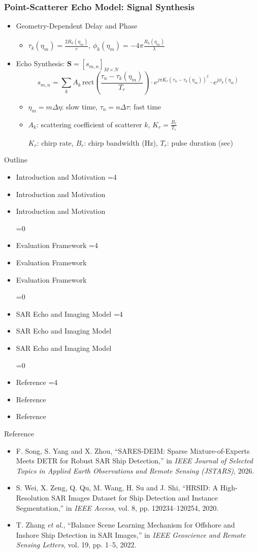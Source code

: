 \documentclass[aspectratio=169, 11pt]{beamer}
\newcommand{\dsrlabActiveSec}{0}
\newcommand{\dsrlaboutlineitem}[2]{%
  \ifnum\dsrlabActiveSec=0
    \item #2
  \else
    \ifnum#1=\dsrlabActiveSec
      \item #2
    \else
      \item {\color{dsrlabGrayLabel}#2}
    \fi
  \fi
}
\newcommand{\dsrlabSectionOutline}[1]{%
  \renewcommand{\dsrlabActiveSec}{#1}%
  \begin{frame}{Outline}
    \begin{itemize}
      \dsrlaboutlineitem{1}{Introduction and Motivation}
      \dsrlaboutlineitem{2}{Evaluation Framework}
      \dsrlaboutlineitem{3}{SAR Echo and Imaging Model}
      \dsrlaboutlineitem{4}{Reference}
    \end{itemize}
  \end{frame}
}
\begin{document}
{
\begin{frame}
  \frametitle{Point-Scatterer Echo Model: Signal Synthesis}
  \begin{itemize}
    \item Geometry-Dependent Delay and Phase
    \begin{itemize}
      \item $\tau_k(\eta_m)=\frac{2R_k(\eta_m)}{c}$, $\phi_k(\eta_m)=-4\pi\frac{R_k(\eta_m)}{\lambda}$
    \end{itemize}
    \item Echo Synthesis: $\mathbf{S} = [s_{m,n}]_{M\times N}$
    $$
      s_{m,n} = \sum_k A_k\,\mathrm{rect}\!\left(\frac{\tau_n - \tau_k(\eta_m)}{T_r}\right)
            \cdot e^{j\pi K_r\left(\tau_n - \tau_k(\eta_m)\right)^2}
            \cdot e^{j\phi_k(\eta_m)}
    $$
    \begin{itemize}
      \item $\eta_m = m\Delta\eta$: slow time, $\tau_n = n\Delta\tau$: fast time
      \item $A_k$: scattering coefficient of scatterer $k$, $K_r=\frac{B_r}{T_r}$

      {\footnotesize $K_r$: chirp rate, $B_r$: chirp bandwidth (Hz), $T_r$: pulse duration (sec)}
    \end{itemize}
  \end{itemize}
\end{frame}
}

\dsrlabSectionOutline{4}

\begin{frame}{Reference}
  \begin{itemize}
    \item[{\color{black}[1]}] F. Song, S. Yang and X. Zhou, ``SARES-DEIM: Sparse Mixture-of-Experts Meets DETR for Robust SAR Ship Detection,'' in \textit{IEEE Journal of Selected Topics in Applied Earth Observations and Remote Sensing (JSTARS)}, 2026.
    \item[{\color{black}[2]}] S. Wei, X. Zeng, Q. Qu, M. Wang, H. Su and J. Shi, ``HRSID: A High-Resolution SAR Images Dataset for Ship Detection and Instance Segmentation,'' in \textit{IEEE Access}, vol. 8, pp. 120234--120254, 2020.
    \item[{\color{black}[3]}] T. Zhang \textit{et al.}, ``Balance Scene Learning Mechanism for Offshore and Inshore Ship Detection in SAR Images,'' in \textit{IEEE Geoscience and Remote Sensing Letters}, vol. 19, pp. 1--5, 2022.
  \end{itemize}
\end{frame}
\end{document}
